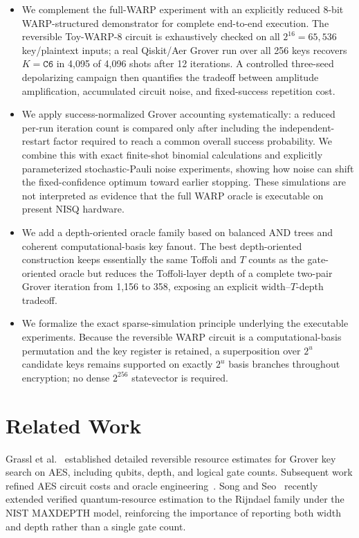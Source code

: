 \documentclass[10pt,a4paper]{article}
\begin{document}
\begin{itemize}
    \item We complement the full-WARP experiment with an explicitly reduced 8-bit WARP-structured demonstrator for complete end-to-end execution. The reversible Toy-WARP-8 circuit is exhaustively checked on all $2^{16}=65{,}536$ key/plaintext inputs; a real Qiskit/Aer Grover run over all 256 keys recovers $K=\mathtt{C6}$ in 4,095 of 4,096 shots after 12 iterations. A controlled three-seed depolarizing campaign then quantifies the tradeoff between amplitude amplification, accumulated circuit noise, and fixed-success repetition cost.
    \item We apply success-normalized Grover accounting systematically: a reduced per-run iteration count is compared only after including the independent-restart factor required to reach a common overall success probability.  We combine this with exact finite-shot binomial calculations and explicitly parameterized stochastic-Pauli noise experiments, showing how noise can shift the fixed-confidence optimum toward earlier stopping.  These simulations are not interpreted as evidence that the full WARP oracle is executable on present NISQ hardware.
    \item We add a depth-oriented oracle family based on balanced AND trees and coherent computational-basis key fanout. The best depth-oriented construction keeps essentially the same Toffoli and $T$ counts as the gate-oriented oracle but reduces the Toffoli-layer depth of a complete two-pair Grover iteration from 1,156 to 358, exposing an explicit width--$T$-depth tradeoff.
    \item We formalize the exact sparse-simulation principle underlying the executable experiments. Because the reversible WARP circuit is a computational-basis permutation and the key register is retained, a superposition over $2^u$ candidate keys remains supported on exactly $2^u$ basis branches throughout encryption; no dense $2^{256}$ statevector is required.
\end{itemize}

\section{Related Work}
Grassl et al.~\cite{Grassl2016} established detailed reversible resource estimates for Grover key search on AES, including qubits, depth, and logical gate counts. Subsequent work refined AES circuit costs and oracle engineering~\cite{Langenberg2020,Jaques2020,Lin2023}. Song and Seo~\cite{SongSeo2026} recently extended verified quantum-resource estimation to the Rijndael family under the NIST MAXDEPTH model, reinforcing the importance of reporting both width and depth rather than a single gate count.
\end{document}
